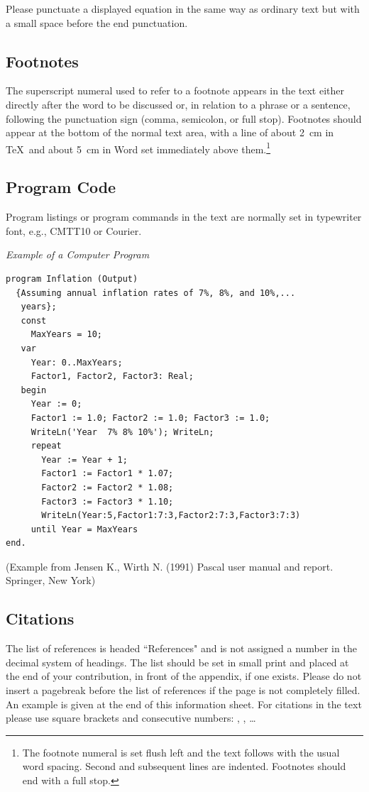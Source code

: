 \documentclass[runningheads]{llncs}
\begin{document}
Please punctuate a displayed equation in the same way as ordinary
text but with a small space before the end punctuation.

\subsection{Footnotes}

The superscript numeral used to refer to a footnote appears in the text
either directly after the word to be discussed or, in relation to a
phrase or a sentence, following the punctuation sign (comma,
semicolon, or full stop). Footnotes should appear at the bottom of
the
normal text area, with a line of about 2~cm in \TeX\ and about 5~cm in
Word set
immediately above them.\footnote{The footnote numeral is set flush left
and the text follows with the usual word spacing. Second and subsequent
lines are indented. Footnotes should end with a full stop.}


\subsection{Program Code}

Program listings or program commands in the text are normally set in
typewriter font, e.g., CMTT10 or Courier.

\noindent
{\it Example of a Computer Program}
\begin{verbatim}
program Inflation (Output)
  {Assuming annual inflation rates of 7%, 8%, and 10%,...
   years};
   const
     MaxYears = 10;
   var
     Year: 0..MaxYears;
     Factor1, Factor2, Factor3: Real;
   begin
     Year := 0;
     Factor1 := 1.0; Factor2 := 1.0; Factor3 := 1.0;
     WriteLn('Year  7% 8% 10%'); WriteLn;
     repeat
       Year := Year + 1;
       Factor1 := Factor1 * 1.07;
       Factor2 := Factor2 * 1.08;
       Factor3 := Factor3 * 1.10;
       WriteLn(Year:5,Factor1:7:3,Factor2:7:3,Factor3:7:3)
     until Year = MaxYears
end.
\end{verbatim}
%
\noindent
{\small (Example from Jensen K., Wirth N. (1991) Pascal user manual and
report. Springer, New York)}



\subsection{Citations}

The list of references is headed ``References" and is not assigned a
number
in the decimal system of headings. The list should be set in small print
and placed at the end of your contribution, in front of the appendix,
if one exists.
Please do not insert a pagebreak before the list of references if the
page is not completely filled.
An example is given at the
end of this information sheet. For citations in the text please use
square brackets and consecutive numbers: \cite{Alpher02},
\cite{Alpher03}, \cite{Alpher04} \dots
\end{document}
